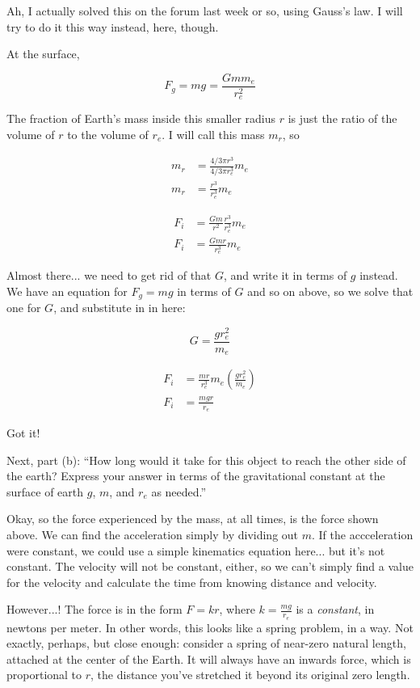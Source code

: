 \documentclass[12pt,a4paper]{report}
\begin{document}
Ah, I actually solved this on the forum last week or so, using Gauss's law. I will try to do it this way instead, here, though.

At the surface,

\begin{equation}
F_g = m g = \frac{G m m_e}{r_e^2}
\end{equation}

The fraction of Earth's mass inside this smaller radius $r$ is just the ratio of the volume of $r$ to the volume of $r_e$. I will call this mass $m_r$, so

\begin{align}
m_r &= \frac{4/3 \pi r^3}{4/3 \pi r_e^3} m_e\\
m_r &= \frac{r^3}{r_e^3} m_e
\end{align}

\begin{align}
F_i &= \frac{G m}{r^2} \frac{r^3}{r_e^3} m_e\\
F_i &= \frac{G m r}{r_e^3} m_e
\end{align}

Almost there... we need to get rid of that $G$, and write it in terms of $g$ instead. We have an equation for $F_g = m g$ in terms of $G$ and so on above, so we solve that one for $G$, and substitute in in here:

\begin{equation}
G = \frac{g r_e^2}{m_e}
\end{equation}

\begin{align}
F_i &= \frac{m r}{r_e^3} m_e \left(\frac{g r_e^2}{m_e}\right)\\
F_i &= \frac{m g r}{r_e}
\end{align}

Got it!

Next, part (b): ``How long would it take for this object to reach the other side of the earth? Express your answer in terms of the gravitational constant at the surface of earth $g$, $m$, and $r_e$ as needed.''

Okay, so the force experienced by the mass, at all times, is the force shown above. We can find the acceleration simply by dividing out $m$. If the accceleration were constant, we could use a simple kinematics equation here... but it's not constant. The velocity will not be constant, either, so we can't simply find a value for the velocity and calculate the time from knowing distance and velocity.

However...! The force is in the form $F = k r$, where $k = \frac{m g}{r_e}$ is a \emph{constant}, in newtons per meter. In other words, this looks like a spring problem, in a way. Not exactly, perhaps, but close enough: consider a spring of near-zero natural length, attached at the center of the Earth. It will always have an inwards force, which is proportional to $r$, the distance you've stretched it beyond its original zero length.
\end{document}
